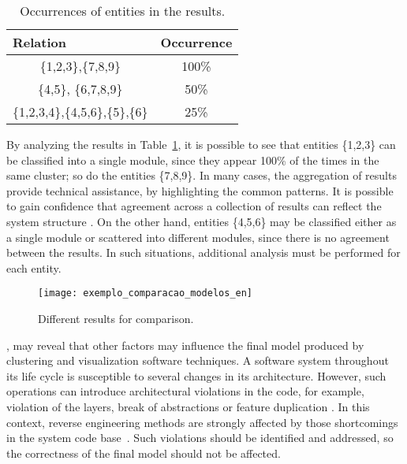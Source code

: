 \begin{table}[h]
	\centering
	\caption{Occurrences of entities in the results.}
	\label{ocorrencias_1}
	\begin{tabular}{|cc|}
		\hline
		\multicolumn{1}{|l}{Relation} & \multicolumn{1}{l|}{Occurrence} \\ \hline
		\{1,2,3\},\{7,8,9\}                  & 100\%                           \\ \hline
		\{4,5\}, \{6,7,8,9\}                    & 50\%                          \\ \hline
		\{1,2,3,4\},\{4,5,6\},\{5\},\{6\}                  & 25\%           \\ \hline
	\end{tabular}
\end{table}

By analyzing the results in Table~\ref{ocorrencias_1}, it is possible to see that entities \{1,2,3\} can be classified into a single module, since they appear 100\% of the times in the same cluster; so do the entities \{7,8,9\}. In many cases, the aggregation of results provide technical assistance, by highlighting the common patterns. It is possible to gain confidence that agreement across a collection of results can reflect the system structure \cite{craft}. On the other hand, entities \{4,5,6\} may be classified either as a single module or scattered into different modules, since there is no agreement between the results. In such situations, additional analysis must be performed for each entity. 

\begin{figure}[!h]
	\centering
	\texttt{[image: exemplo\_comparacao\_modelos\_en]}
	\caption{Different results for comparison.}
	\label{exemplo_comparacao_modelos}
\end{figure}

, may reveal that other factors may influence the final model produced by clustering and visualization software techniques. A software system throughout its life cycle is susceptible to several changes in its architecture. However, such operations can introduce architectural violations in the code, for example, violation of the layers, break of abstractions or feature duplication \cite{kazman_view_1998}. In this context, reverse engineering methods are strongly affected by those shortcomings in the system code base~\cite{Platenius_2012}.  Such violations should be identified and addressed, so the correctness of the final model should not be affected.

